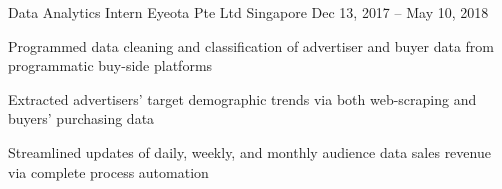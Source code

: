\begin{cventries}
  \cventry
    {Data Analytics Intern} %
    {Eyeota Pte Ltd } %
    {Singapore} %
    {Dec 13, 2017 – May 10, 2018} %
    {
      \begin{cvitems} %
        \item {Programmed data cleaning and classification of advertiser and buyer data from programmatic buy-side platforms}
        \item {Extracted advertisers’ target demographic trends via both web-scraping and buyers’ purchasing data}
        \item {Streamlined updates of daily, weekly, and monthly audience data sales revenue via complete process automation}
      \end{cvitems}
    }



\end{cventries}
